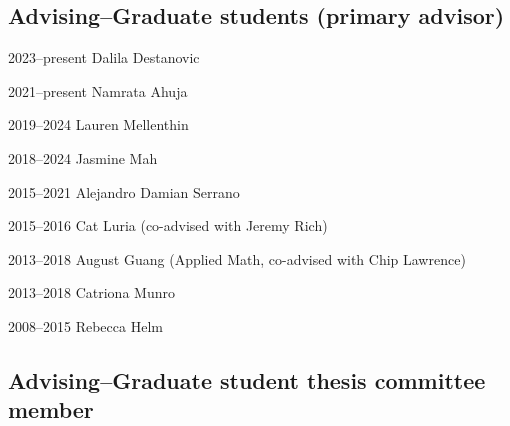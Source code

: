 \subsection*{Advising--Graduate students (primary advisor)}

\begin{entry}{60pt}
\item [\rm 2023--present] Dalila Destanovic
\item [\rm 2021--present] Namrata Ahuja
\item [\rm 2019--2024] Lauren Mellenthin
\item [\rm 2018--2024] Jasmine Mah
\item [\rm 2015--2021] Alejandro Damian Serrano
\item [\rm 2015--2016] Cat Luria (co-advised with Jeremy Rich)
\item [\rm 2013--2018] August Guang (Applied Math, co-advised with Chip Lawrence)
\item [\rm 2013--2018] Catriona Munro
\item [\rm 2008--2015] Rebecca Helm


\end{entry}


\subsection*{Advising--Graduate student thesis committee member}

